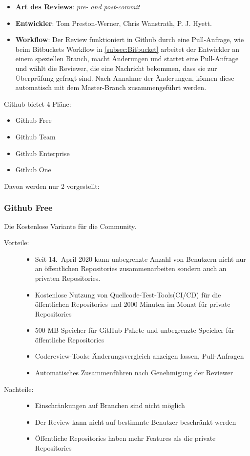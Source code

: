 \begin{itemize}
	\item \textbf{Art des Reviews}: \textit{pre- and post-commit}
	\item \textbf{Entwickler}: Tom Preston-Werner, Chris Wanstrath, P. J. Hyett.
	\item \textbf{Workflow}: Der Review funktioniert in Github durch eine Pull-Anfrage, wie beim Bitbuckets Workflow in \cref{subsec:Bitbucket} arbeitet der Entwickler an einem
		speziellen Branch, macht Änderungen und startet eine Pull-Anfrage und wählt die Reviewer, die eine Nachricht bekommen, dass sie zur Überprüfung gefragt sind. Nach Annahme der
		Änderungen, können diese automatisch mit dem Master-Branch zusammengeführt werden.
\end{itemize}

Github bietet 4 Pläne:
\begin{itemize}
	\item Github Free
	\item Github Team
	\item Github Enterprise
	\item Github One
\end{itemize}
Davon werden nur 2 vorgestellt:

\subsubsection{Github Free}
\label{subsubsec:Free}

Die Kostenlose Variante für die Community.
\begin{description}
	\item [Vorteile:] \hfill
	\begin{itemize}
		\item Seit 14.~April 2020 kann unbegrenzte Anzahl von Benutzern nicht nur an öffentlichen Repositories zusammenarbeiten sondern auch an privaten Repositories.
		\item Kostenlose Nutzung von Quellcode-Test-Tools(\ac{CI}/\ac{CD}) für die öffentlichen Repositories und 2000 Minuten im Monat für private Repositories
		\item 500 MB Speicher für GitHub-Pakete und unbegrenzte Speicher für öffentliche Repositories
		\item Codereview-Tools: Änderungsvergleich anzeigen lassen, Pull-Anfragen
		\item Automatisches Zusammenführen nach Genehmigung der Reviewer
	\end{itemize}
	\item [Nachteile:] \hfill
	\begin{itemize}
		\item Einschränkungen auf Branchen sind nicht möglich
		\item Der Review kann nicht auf bestimmte Benutzer beschränkt werden
		\item Öffentliche Repositories haben mehr Features als die private Repositories
	\end{itemize}
\end{description}


